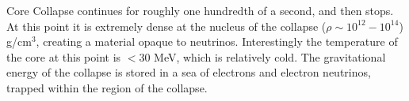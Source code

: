 Core Collapse continues for roughly one hundredth of a second, and then stops.
At this point it is extremely dense at the nucleus of the collapse ($\rho \sim 10^{12} - 10^{14}$) g/cm$^{3}$, creating a material opaque to neutrinos.
Interestingly the temperature of the core at this point is $< 30$ MeV, which is relatively cold.
The gravitational energy of the collapse is stored in a sea of electrons and electron neutrinos, trapped within the region of the collapse.
























































